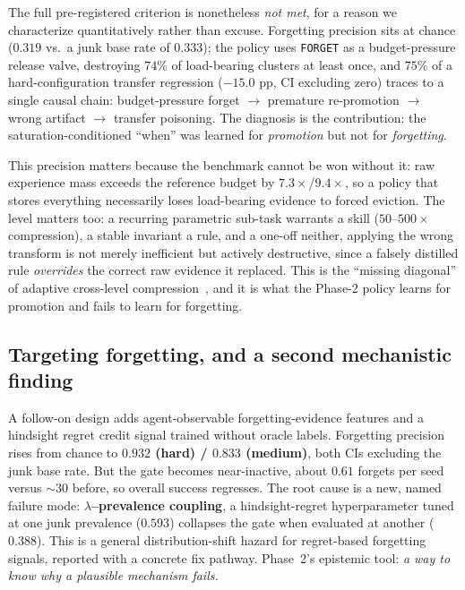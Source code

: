 \documentclass[11pt]{article}
\begin{document}
The full pre-registered criterion is nonetheless \emph{not met}, for a reason we
characterize quantitatively rather than excuse. Forgetting precision sits at chance
($0.319$ vs.\ a junk base rate of $0.333$); the policy uses \texttt{FORGET} as a
budget-pressure release valve, destroying $74\%$ of load-bearing clusters at least
once, and $75\%$ of a hard-configuration transfer regression ($-15.0$ pp, CI
excluding zero) traces to a single causal chain: budget-pressure forget $\rightarrow$
premature re-promotion $\rightarrow$ wrong artifact $\rightarrow$ transfer poisoning.
The diagnosis is the contribution: the saturation-conditioned ``when'' was learned
for \emph{promotion} but not for \emph{forgetting}.

This precision matters because the benchmark cannot be won without it: raw experience
mass exceeds the reference budget by $7.3\times$/$9.4\times$, so a policy that stores
everything necessarily loses load-bearing evidence to forced eviction. The level
matters too: a recurring parametric sub-task warrants a skill ($50$--$500\times$
compression), a stable invariant a rule, and a one-off neither, applying the wrong
transform is not merely inefficient but actively destructive, since a falsely
distilled rule \emph{overrides} the correct raw evidence it replaced. This is the
``missing diagonal'' of adaptive cross-level compression~\cite{compspectrum}, and it
is what the Phase-2 policy learns for promotion and fails to learn for forgetting.

\subsection{Targeting forgetting, and a second mechanistic finding}
A follow-on design adds agent-observable forgetting-evidence features and a hindsight
regret credit signal trained without oracle labels. Forgetting precision rises from
chance to \textbf{$0.932$ (hard) / $0.833$ (medium)}, both CIs excluding the junk base
rate. But the gate becomes near-inactive, about $0.61$ forgets per seed versus
${\sim}30$ before, so overall success regresses. The root cause is a new,
named failure mode: \textbf{$\lambda$--prevalence coupling}, a hindsight-regret
hyperparameter tuned at one junk prevalence ($0.593$) collapses the gate when
evaluated at another ($0.388$). This is a general distribution-shift hazard for
regret-based forgetting signals, reported with a concrete fix pathway. Phase~2's
epistemic tool: \emph{a way to know why a plausible mechanism fails.}
\end{document}
